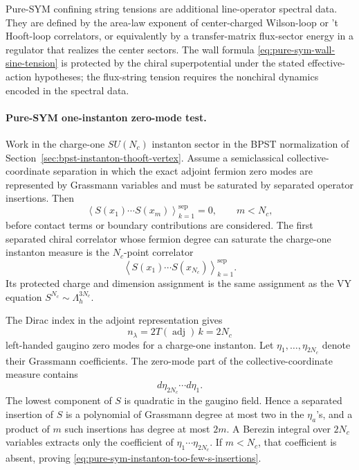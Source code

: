 Pure-SYM confining string tensions are additional line-operator spectral data.
They are defined by the area-law exponent of center-charged Wilson-loop or
't Hooft-loop correlators, or equivalently by a transfer-matrix flux-sector
energy in a regulator that realizes the center sectors.  The wall formula
\eqref{eq:pure-sym-wall-sine-tension} is protected by the chiral
superpotential under the stated effective-action hypotheses; the flux-string
tension requires the nonchiral dynamics encoded in the spectral data.

\paragraph{Pure-SYM one-instanton zero-mode test.}
\label{par:pure-sym-one-instanton-zero-mode-test}
Work in the charge-one \(SU(N_c)\) instanton sector in the BPST
normalization of Section~\ref{sec:bpst-instanton-thooft-vertex}.  Assume a
semiclassical collective-coordinate separation in which the exact adjoint
fermion zero modes are represented by Grassmann variables and must be
saturated by separated operator insertions.  Then
\begin{equation}
  \left\langle S(x_1)\cdots S(x_m)\right\rangle_{k=1}^{\mathrm{sep}}=0,
  \qquad m<N_c,
  \label{eq:pure-sym-instanton-too-few-s-insertions}
\end{equation}
before contact terms or boundary contributions are considered.  The first
separated chiral correlator whose fermion degree can saturate the
charge-one instanton measure is the \(N_c\)-point correlator
\begin{equation}
  \left\langle S(x_1)\cdots S(x_{N_c})\right\rangle_{k=1}^{\mathrm{sep}}.
  \label{eq:pure-sym-instanton-first-saturated-correlator}
\end{equation}
Its protected charge and dimension assignment is the same assignment as the VY
equation \(S^{N_c}\sim \Lambda_h^{3N_c}\).

The Dirac index in the adjoint representation gives
\[
  n_\lambda=2T(\operatorname{adj})\,k=2N_c
\]
left-handed gaugino zero modes for a charge-one instanton.  Let
\(\eta_1,\ldots,\eta_{2N_c}\) denote their Grassmann coefficients.  The
zero-mode part of the collective-coordinate measure contains
\[
  d\eta_{2N_c}\cdots d\eta_1 .
\]
The lowest component of \(S\) is quadratic in the gaugino field.  Hence a
separated insertion of \(S\) is a polynomial of Grassmann degree at most
two in the \(\eta_a\)'s, and a product of \(m\) such insertions has degree at
most \(2m\).  A Berezin integral over \(2N_c\) variables extracts only the
coefficient of \(\eta_1\cdots\eta_{2N_c}\).  If \(m<N_c\), that coefficient
is absent, proving \eqref{eq:pure-sym-instanton-too-few-s-insertions}.

